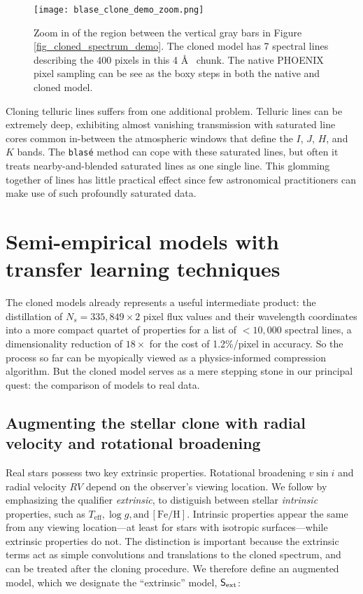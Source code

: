 \documentclass[trackchanges]{aastex631}
\begin{document}
\begin{figure}[hbt!]
    \centering
    \texttt{[image: blase\_clone\_demo\_zoom.png]}
    \caption{Zoom in of the region between the vertical gray bars in Figure \ref{fig_cloned_spectrum_demo}. The cloned model has 7 spectral lines describing the 400 pixels in this 4 \AA~ chunk.  The native PHOENIX pixel sampling can be see as the boxy steps in both the native and cloned model.  }
    \label{fig_zoom_cloning_performance}
\end{figure}

Cloning telluric lines suffers from one additional problem.  Telluric lines can be extremely deep, exhibiting almost vanishing transmission with saturated line cores common in-between the atmospheric windows that define the $I$, $J$, $H$, and $K$ bands.  The \texttt{blas\'e} method can cope with these saturated lines, but often it treats nearby-and-blended saturated lines as one single line.  This glomming together of lines has little practical effect since few astronomical practitioners can make use of such profoundly saturated data.


\section{Semi-empirical models with transfer learning techniques}\label{transferLearn}


The cloned models already represents a useful intermediate product: the distillation of $N_s=335,849\times2$ pixel flux values and their wavelength coordinates into a more compact quartet of properties for a list of $<10,000$ spectral lines, a dimensionality reduction of $18\times$ for the cost of 1.2\%/pixel in accuracy.  So the process so far can be myopically viewed as a physics-informed compression algorithm.  But the cloned model serves as a mere stepping stone in our principal quest: the comparison of models to real data.

\subsection{Augmenting the stellar clone with radial velocity and rotational broadening }
Real stars possess two key extrinsic properties.  Rotational broadening $v\sin{i}$ and radial velocity $RV$ depend on the observer's viewing location. We follow \citet{czekala15} by emphasizing the qualifier \emph{extrinsic}, to distiguish between stellar \emph{intrinsic} properties, such as $T_{\mathrm{eff}}, \log{g},\mathrm{and\,} [\mathrm{Fe}/\mathrm{H}]$.  Intrinsic properties appear the same from any viewing location---at least for stars with isotropic surfaces---while extrinsic properties do not.  The distinction is important because the extrinsic terms act as simple convolutions and translations to the cloned spectrum, and can be treated after the cloning procedure.  We therefore define an augmented model, which we designate the ``extrinsic'' model, $\mathsf{S}_{\rm ext}$:
\end{document}
